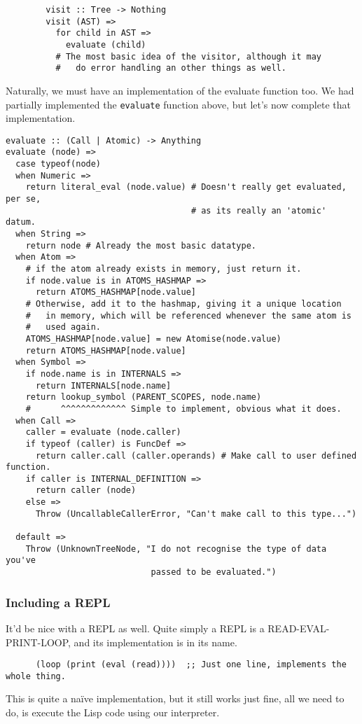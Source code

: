 \documentclass{article}
\newcommand{\code}[1]{\texttt{#1}}
\begin{document}
      \begin{verbatim}
        visit :: Tree -> Nothing
        visit (AST) =>
          for child in AST =>
            evaluate (child)
          # The most basic idea of the visitor, although it may
          #   do error handling an other things as well.
      \end{verbatim}

      Naturally, we must have an implementation of the evaluate function too.
      We had partially implemented the \code{evaluate} function above, but let's
      now complete that implementation.

      \clearpage

      \begin{verbatim}
evaluate :: (Call | Atomic) -> Anything
evaluate (node) =>
  case typeof(node)
  when Numeric =>
    return literal_eval (node.value) # Doesn't really get evaluated, per se,
                                     # as its really an 'atomic' datum.
  when String =>
    return node # Already the most basic datatype.
  when Atom =>
    # if the atom already exists in memory, just return it.
    if node.value is in ATOMS_HASHMAP =>
      return ATOMS_HASHMAP[node.value]
    # Otherwise, add it to the hashmap, giving it a unique location
    #   in memory, which will be referenced whenever the same atom is
    #   used again.
    ATOMS_HASHMAP[node.value] = new Atomise(node.value)
    return ATOMS_HASHMAP[node.value]
  when Symbol =>
    if node.name is in INTERNALS =>
      return INTERNALS[node.name]
    return lookup_symbol (PARENT_SCOPES, node.name)
    #      ^^^^^^^^^^^^^ Simple to implement, obvious what it does.
  when Call =>
    caller = evaluate (node.caller)
    if typeof (caller) is FuncDef =>
      return caller.call (caller.operands) # Make call to user defined function.
    if caller is INTERNAL_DEFINITION =>
      return caller (node)
    else =>
      Throw (UncallableCallerError, "Can't make call to this type...")

  default =>
    Throw (UnknownTreeNode, "I do not recognise the type of data you've
                             passed to be evaluated.")
      \end{verbatim}

  \subsubsection{Including a REPL} \label{repl}
    It'd be nice with a REPL as well. Quite simply a REPL is a
    READ-EVAL-PRINT-LOOP, and its implementation is in its name.
    \begin{verbatim}
      (loop (print (eval (read))))  ;; Just one line, implements the whole thing.
    \end{verbatim}
    This is quite a na\"{i}ve implementation, but it still works just fine,
    all we need to do, is execute the Lisp code using our interpreter.
\end{document}
